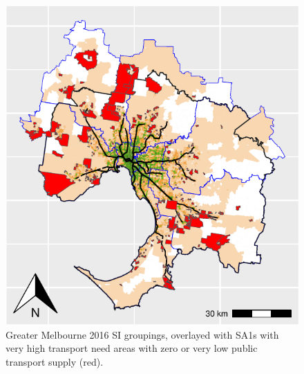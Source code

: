 \documentclass[preprint, 3p,
authoryear]{elsarticle} %
\begin{document}
\begin{figure}
\includegraphics[width=1\linewidth]{ReynoldsCurrieQu2024_files/figure-latex/Greater_Melbourne_2016_needs_gap_map_figure-1} \caption{Greater Melbourne 2016 SI groupings, overlayed with SA1s with very high transport need areas with zero or very low public transport supply (red).}\label{fig:Greater_Melbourne_2016_needs_gap_map_figure}
\end{figure}
\end{document}
